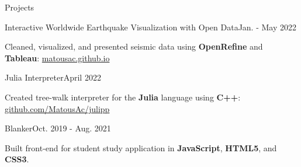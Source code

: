 \begin{rSection}{Projects}
	\begin{project}{Interactive Worldwide Earthquake Visualization with Open Data}{Jan. - May 2022}{}{}
		\item Cleaned, visualized, and presented seismic data using {\bf OpenRefine} and {\bf Tableau}: \href{https://matousac.github.io/}{matousac.github.io}
	\end{project}
	\begin{project}{Julia Interpreter}{April 2022}{}{}
		\item Created tree-walk interpreter for the {\bf Julia} language using {\bf C++}: \href{https://github.com/MatousAc/julipp}{github.com/MatousAc/julipp}
	\end{project}
	\begin{project}{Blanker}{Oct. 2019 - Aug. 2021}{}{}
		\item Built front-end for student study application in {\bf JavaScript}, {\bf HTML5}, and {\bf CSS3}.
	\end{project}
\end{rSection}